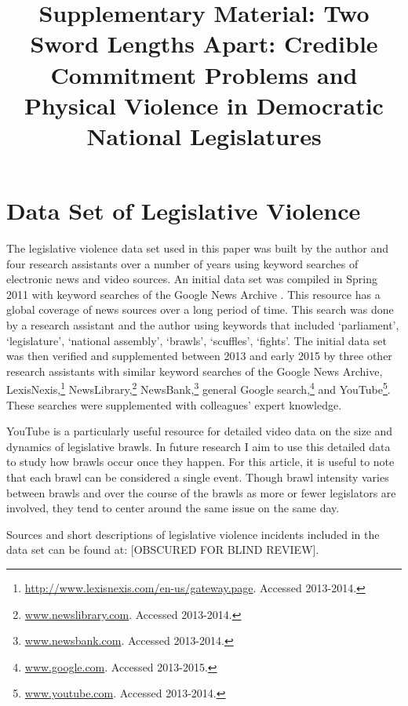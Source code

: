 \documentclass[a4paper]{article}\usepackage[]{graphicx}\usepackage[]{color}
\title{Supplementary Material: Two Sword Lengths Apart: Credible Commitment Problems and Physical Violence in Democratic National Legislatures}
\begin{document}
\maketitle



\section*{Data Set of Legislative Violence}


The legislative violence data set used in this paper was built by the author and four research assistants over a number of years using keyword searches of electronic news and video sources. An initial data set was compiled in Spring 2011 with keyword searches of the Google News Archive \citep{GoogleNews2011}. This resource has a global coverage of news sources over a long period of time. This search was done by a research assistant and the author using keywords that included `parliament', `legislature', `national assembly', `brawls', `scuffles', `fights'. The initial data set was then verified and supplemented between 2013 and early 2015 by three other research assistants with similar keyword searches of the Google News Archive, LexisNexis,\footnote{\url{http://www.lexisnexis.com/en-us/gateway.page}. Accessed 2013-2014.} NewsLibrary,\footnote{\url{www.newslibrary.com}. Accessed 2013-2014.} NewsBank,\footnote{\url{www.newsbank.com}. Accessed 2013-2014.} general Google search,\footnote{\url{www.google.com}. Accessed 2013-2015.} and YouTube\footnote{\url{www.youtube.com}. Accessed 2013-2014.}. These searches were supplemented with colleagues' expert knowledge.

YouTube is a particularly useful resource for detailed video data on the size and dynamics of legislative brawls. In future research I aim to use this detailed data to study how brawls occur once they happen. For this article, it is useful to note that each brawl can be considered a single event. Though brawl intensity varies between brawls and over the course of the brawls as more or fewer legislators are involved, they tend to center around the same issue on the same day.

Sources and short descriptions of legislative violence incidents included in the data set can be found at:
[OBSCURED FOR BLIND REVIEW].
\end{document}
